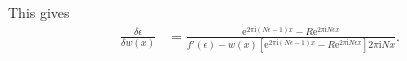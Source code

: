 \documentclass[english, parskip=full]{scrartcl}
\newcommand{\klam}{}
\renewcommand{\i}{\text{i}}
\newcommand{\e}{\text{e}}
\begin{document}
This gives
\begin{align}
\frac{\delta \epsilon}{\delta w(x)} &= \frac{\e^{2\pi\i (N\epsilon - 1) x} - R\e^{2\pi\i N\epsilon x}}{f'(\epsilon) - w(x) \klam\left[ \e^{2\pi\i (N\epsilon - 1) x} - R\e^{2\pi\i N\epsilon x} \right] 2\pi\i N x }.
\end{align}

\end{document}
